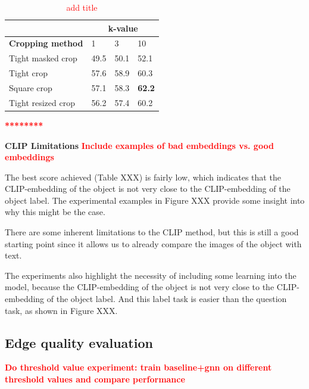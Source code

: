\begin{table}[htbp]
    \centering
    \caption{\textcolor{red}{add title}}
    \begin{tabular}{l|lll|}
    \cline{2-4}
                                                   & \multicolumn{3}{c|}{\textbf{k-value}} \\ \hline
    \multicolumn{1}{|c|}{\textbf{Cropping method}} & 1        & 3       & 10               \\ \hline
    \multicolumn{1}{|l|}{Tight masked crop}        & 49.5     & 50.1    & 52.1             \\
    \multicolumn{1}{|l|}{Tight crop}               & 57.6     & 58.9    & 60.3             \\
    \multicolumn{1}{|l|}{Square crop}              & 57.1     & 58.3    & \textbf{62.2}    \\
    \multicolumn{1}{|l|}{Tight resized crop}       & 56.2     & 57.4    & 60.2             \\ \hline
    \end{tabular}
\end{table}

\textcolor{red}{\textbf{********}}

\bigskip
\noindent
\textbf{CLIP Limitations}
\textcolor{red}{\textbf{Include examples of bad embeddings vs. good embeddings}}

The best score achieved (Table XXX) is fairly low, which indicates that the CLIP-embedding of the object is not very close to the CLIP-embedding of the object label. The experimental examples in Figure XXX provide some insight into why this might be the case.

There are some inherent limitations to the CLIP method, but this is still a good starting point since it allows us to already compare the images of the object with text.

The experiments also highlight the necessity of including some learning into the model, because the CLIP-embedding of the object is not very close to the CLIP-embedding of the object label. And this label task is easier than the question task, as shown in Figure XXX.

\subsection{Edge quality evaluation}

\textcolor{red}{\textbf{Do threshold value experiment: train baseline+gnn on different threshold values and compare performance}}

